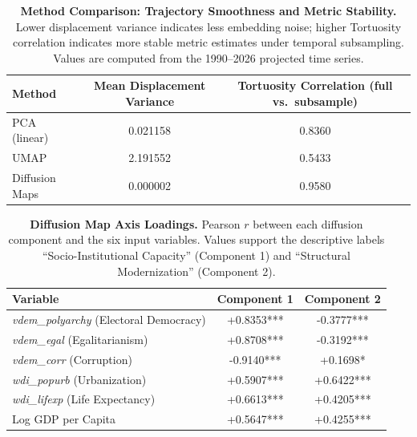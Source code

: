 \documentclass[12pt]{article}
\begin{document}
\begin{table}[htbp]
    \centering
    \caption{\textbf{Method Comparison: Trajectory Smoothness and Metric Stability.} Lower displacement variance indicates less embedding noise; higher Tortuosity correlation indicates more stable metric estimates under temporal subsampling. Values are computed from the 1990--2026 projected time series.}
    \label{tab:method_comparison}
    \begin{tabular}{lcc}
        \toprule
        Method         & Mean Displacement Variance & Tortuosity Correlation (full vs.\ subsample) \\
        \midrule
        PCA (linear)   & 0.021158                   & 0.8360                                       \\
        UMAP           & 2.191552                   & 0.5433                                       \\
        Diffusion Maps & 0.000002                   & 0.9580                                       \\
        \bottomrule
    \end{tabular}
\end{table}

\begin{table}[htbp]
    \centering
    \caption{\textbf{Diffusion Map Axis Loadings.} Pearson $r$ between each diffusion component and the six input variables. Values support the descriptive labels ``Socio-Institutional Capacity'' (Component 1) and ``Structural Modernization'' (Component 2).}
    \label{tab:axis_loadings}
    \begin{tabular}{lcc}
        \toprule
        Variable                                       & Component 1 & Component 2 \\
        \midrule
        \textit{vdem\_polyarchy} (Electoral Democracy) & +0.8353***  & -0.3777***  \\
        \textit{vdem\_egal} (Egalitarianism)           & +0.8708***  & -0.3192***  \\
        \textit{vdem\_corr} (Corruption)               & -0.9140***  & +0.1698*    \\
        \textit{wdi\_popurb} (Urbanization)            & +0.5907***  & +0.6422***  \\
        \textit{wdi\_lifexp} (Life Expectancy)         & +0.6613***  & +0.4205***  \\
        Log GDP per Capita                             & +0.5647***  & +0.4255***  \\
        \bottomrule
    \end{tabular}
\end{table}
\end{document}

